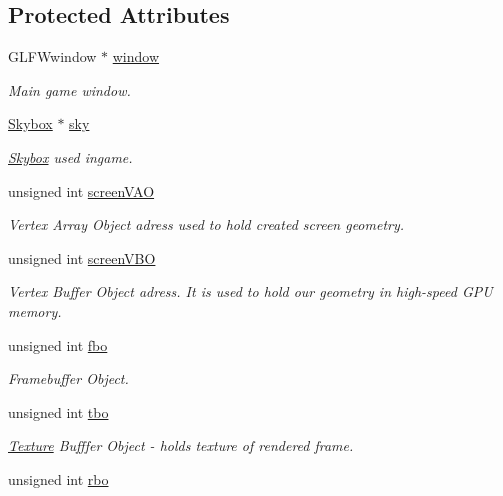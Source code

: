\subsection*{Protected Attributes}
\begin{DoxyCompactItemize}
\item 
G\+L\+F\+Wwindow $\ast$ \mbox{\hyperlink{class_game_ad9bc7cf39168a1ceaf77d6177116aa94}{window}}
\begin{DoxyCompactList}\small\item\em Main game window. \end{DoxyCompactList}\item 
\mbox{\hyperlink{class_skybox}{Skybox}} $\ast$ \mbox{\hyperlink{class_game_a46b9b13579445bc071f6cba24953b531}{sky}}
\begin{DoxyCompactList}\small\item\em \mbox{\hyperlink{class_skybox}{Skybox}} used ingame. \end{DoxyCompactList}\item 
unsigned int \mbox{\hyperlink{class_game_a92aabad09ef89df6964b62b89c2f7edb}{screen\+V\+AO}}
\begin{DoxyCompactList}\small\item\em Vertex Array Object adress used to hold created screen geometry. \end{DoxyCompactList}\item 
unsigned int \mbox{\hyperlink{class_game_a64dfde0688161bc1d584fc448c496e49}{screen\+V\+BO}}
\begin{DoxyCompactList}\small\item\em Vertex Buffer Object adress. It is used to hold our geometry in high-\/speed G\+PU memory. \end{DoxyCompactList}\item 
unsigned int \mbox{\hyperlink{class_game_a64cdbfe0d81d60426bb6523459d7b52c}{fbo}}
\begin{DoxyCompactList}\small\item\em Framebuffer Object. \end{DoxyCompactList}\item 
unsigned int \mbox{\hyperlink{class_game_af04f4198d017854557726ab48726e709}{tbo}}
\begin{DoxyCompactList}\small\item\em \mbox{\hyperlink{class_texture}{Texture}} Bufffer Object -\/ holds texture of rendered frame. \end{DoxyCompactList}\item 
unsigned int \mbox{\hyperlink{class_game_a521e6ba079b5beb2d552137f9363e36e}{rbo}}

\end{DoxyCompactItemize}
